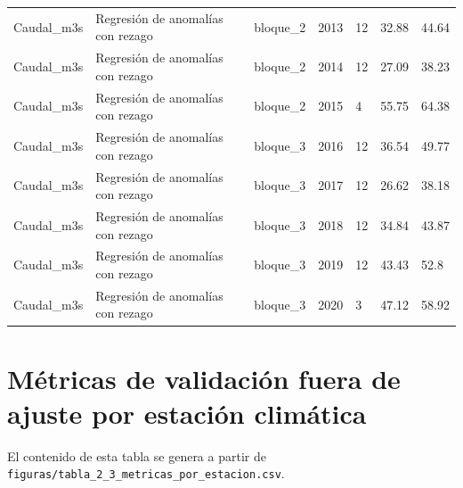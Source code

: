 \begin{longtable}{lllllll}
Caudal\_m3s & Regresión de anomalías con rezago & bloque\_2 & 2013 & 12 & 32.88 & 44.64 \\
Caudal\_m3s & Regresión de anomalías con rezago & bloque\_2 & 2014 & 12 & 27.09 & 38.23 \\
Caudal\_m3s & Regresión de anomalías con rezago & bloque\_2 & 2015 & 4 & 55.75 & 64.38 \\
Caudal\_m3s & Regresión de anomalías con rezago & bloque\_3 & 2016 & 12 & 36.54 & 49.77 \\
Caudal\_m3s & Regresión de anomalías con rezago & bloque\_3 & 2017 & 12 & 26.62 & 38.18 \\
Caudal\_m3s & Regresión de anomalías con rezago & bloque\_3 & 2018 & 12 & 34.84 & 43.87 \\
Caudal\_m3s & Regresión de anomalías con rezago & bloque\_3 & 2019 & 12 & 43.43 & 52.8 \\
Caudal\_m3s & Regresión de anomalías con rezago & bloque\_3 & 2020 & 3 & 47.12 & 58.92 \\
\end{longtable}

\section{Métricas de validación fuera de ajuste por estación climática}
El contenido de esta tabla se genera a partir de \texttt{figuras/tabla_2_3_metricas_por_estacion.csv}.

